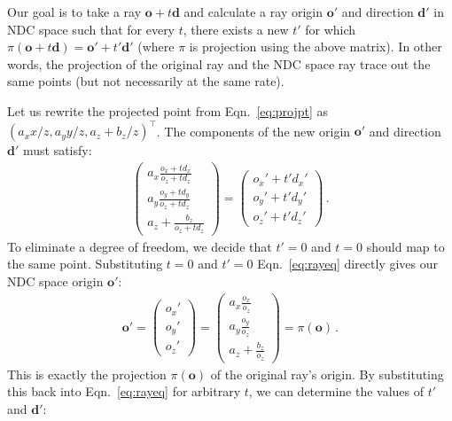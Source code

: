 \documentclass[runningheads]{llncs}
\begin{document}
Our goal is to take a ray $\mathbf o + t \mathbf d$ and calculate a ray origin $\mathbf o'$ and direction $\mathbf d'$ in NDC space such that for every $t$, there exists a new $t'$ for which $\pi(\mathbf o + t \mathbf d) = \mathbf o' + t' \mathbf d'$ (where $\pi$ is projection using the above matrix). In other words, the projection of the original ray and the NDC space ray trace out the same points (but not necessarily at the same rate). 

Let us rewrite the projected point from Eqn.~\ref{eq:projpt} as $(a_x x/z, a_y y/z, a_z + b_z / z)^\top$. The components of the new origin $\mathbf o'$ and direction $\mathbf d'$ must satisfy:
\begin{align}
    \begin{pmatrix}
        a_x \frac{o_x + t d_x}{o_z + t d_z} \\[6pt]
        a_y \frac{o_y + t d_y}{o_z + t d_z} \\[6pt]
        a_z + \frac{b_z}{o_z + t d_z}
    \end{pmatrix}
    =
    \begin{pmatrix}
        o_x' + t' d_x' \\
        o_y' + t' d_y' \\
        o_z' + t' d_z' 
    \end{pmatrix} \, .
    \label{eq:rayeq}
\end{align}
To eliminate a degree of freedom, we decide that $t'=0$ and $t=0$ should map to the same point. Substituting $t=0$ and $t'=0$ Eqn.~\ref{eq:rayeq} directly gives our NDC space origin $\mathbf o'$:
\begin{align}
    \mathbf o' =
    \begin{pmatrix}
        o_x' \\
        o_y' \\
        o_z'
    \end{pmatrix}
    =
    \begin{pmatrix}
        a_x \frac{o_x}{o_z} \\[6pt]
        a_y \frac{o_y}{o_z} \\[6pt]
        a_z + \frac{b_z}{o_z}
    \end{pmatrix}
    = \pi(\mathbf o) \,. 
\end{align}
This is exactly the projection $\pi(\mathbf o)$ of the original ray's origin. By substituting this back into Eqn.~\ref{eq:rayeq} for arbitrary $t$, we can determine the values of $t'$ and $\mathbf d'$:
\end{document}
